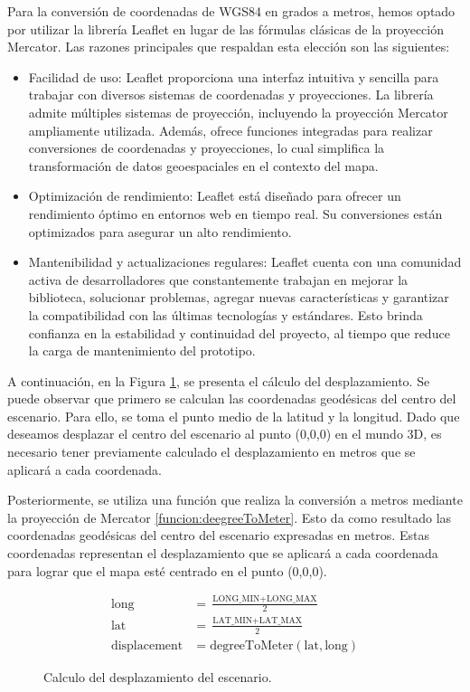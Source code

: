 \documentclass[a4paper, 11pt]{book}
\begin{document}
Para la conversión de coordenadas de WGS84 en grados a metros, hemos optado por utilizar la librería Leaflet en lugar de las fórmulas clásicas de la proyección Mercator. Las razones principales que respaldan esta elección son las siguientes:
\begin{itemize}
    \item Facilidad de uso: Leaflet proporciona una interfaz intuitiva y sencilla para trabajar con diversos sistemas de coordenadas y proyecciones. La librería admite múltiples sistemas de proyección, incluyendo la proyección Mercator ampliamente utilizada. Además, ofrece funciones integradas para realizar conversiones de coordenadas y proyecciones, lo cual simplifica la transformación de datos geoespaciales en el contexto del mapa.
    \item Optimización de rendimiento: Leaflet está diseñado para ofrecer un rendimiento óptimo en entornos web en tiempo real. Su conversiones están optimizados para asegurar un alto rendimiento.
    \item Mantenibilidad y actualizaciones regulares: Leaflet cuenta con una comunidad activa de desarrolladores que constantemente trabajan en mejorar la biblioteca, solucionar problemas, agregar nuevas características y garantizar la compatibilidad con las últimas tecnologías y estándares. Esto brinda confianza en la estabilidad y continuidad del proyecto, al tiempo que reduce la carga de mantenimiento del prototipo.
\end{itemize}
A continuación, en la Figura \ref{formula:desplazamiento}, se presenta el cálculo del desplazamiento. Se puede observar que primero se calculan las coordenadas geodésicas del centro del escenario. Para ello, se toma el punto medio de la latitud y la longitud. Dado que deseamos desplazar el centro del escenario al punto (0,0,0) en el mundo 3D, es necesario tener previamente calculado el desplazamiento en metros que se aplicará a cada coordenada.

Posteriormente, se utiliza una función que realiza la conversión a metros mediante la proyección de Mercator \ref{funcion:deegreeToMeter}. Esto da como resultado las coordenadas geodésicas del centro del escenario expresadas en metros. Estas coordenadas representan el desplazamiento que se aplicará a cada coordenada para lograr que el mapa esté centrado en el punto (0,0,0).
\begin{figure}[h]
\begin{align*}
\text{long} &= \frac{{\text{LONG\_MIN} + \text{LONG\_MAX}}}{2} \\
\text{lat} &= \frac{{\text{LAT\_MIN} + \text{LAT\_MAX}}}{2} \\
\text{displacement} &= \text{degreeToMeter}(\text{lat}, \text{long})
\end{align*}
\caption{Calculo del desplazamiento del escenario.}
  \label{formula:desplazamiento}
\end{figure}
\end{document}
